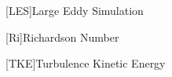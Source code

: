 \begin{acronym}
[LES]{Large Eddy Simulation}
\end{acronym}

\begin{acronym}
[Ri]{Richardson Number}
\end{acronym}

\begin{acronym}
[TKE]{Turbulence Kinetic Energy}
\end{acronym}




\endinput




% 
